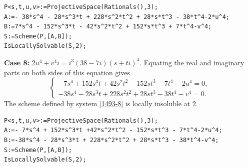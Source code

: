 \documentclass[a4paper,12pt,english,reqno]{amsart}
\begin{document}
\begin{lstlisting}
P<s,t,u,v>:=ProjectiveSpace(Rationals(),3);
A:=- 38*s^4 - 28*s^3*t + 228*s^2*t^2 + 28*s*t^3 - 38*t^4-2*u^4;
B:=7*s^4 - 152*s^3*t - 42*s^2*t^2 + 152*s*t^3 + 7*t^4-v^4;
S:=Scheme(P,[A,B]);
IsLocallySolvable(S,2);
\end{lstlisting}

{\bf Case 8:} $2u^4+v^4i=i^3(38-7i)(s+ti)^4$. Equating the real and imaginary parts on both sides of this equation gives
\begin{equation}\label{1493-8}
\begin{cases}
-7s^4 + 152s^3t + 42s^2t^2 - 152st^3 - 7t^4 - 2u^4=0,\\
-38s^4 - 28s^3t + 228s^2t^2 + 28st^3 - 38t^4 - v^4=0.
\end{cases}
\end{equation}
The scheme defined by system \eqref{1493-8} is locally insoluble at $2$.


\begin{lstlisting}
P<s,t,u,v>:=ProjectiveSpace(Rationals(),3);
A:=- 7*s^4 + 152*s^3*t +42*s^2*t^2 - 152*s*t^3 - 7*t^4-2*u^4;
B:=-38*s^4 - 28*s^3*t + 228*s^2*t^2 + 28*s*t^3 - 38*t^4-v^4;
S:=Scheme(P,[A,B]);
IsLocallySolvable(S,2);
\end{lstlisting}
\end{document}
